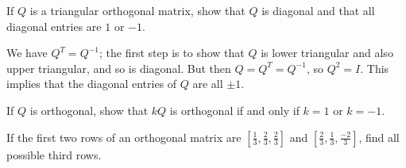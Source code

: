 \documentclass{ximera}
\begin{document}
\begin{problem}\label{prob:triag_orthogonal}
If $Q$ is a triangular orthogonal matrix, show that $Q$ is diagonal and that all diagonal entries are $1$ or $-1$.

\begin{hint}
We have $Q^{T} = Q^{-1}$; the first step is to show that $Q$ is lower triangular and also upper triangular, and so is diagonal. But then $Q = Q^{T} = Q^{-1}$, so $Q^{2} = I$. This implies that the diagonal entries of $Q$ are all $\pm 1$.
\end{hint}
\end{problem}

\begin{problem}\label{prob:scalar_othogonal}
If $Q$ is orthogonal, show that $kQ$ is orthogonal if and only if $k = 1$ or $k = -1$.
\end{problem}

\begin{problem}\label{prob:thirdrow}
If the first two rows of an orthogonal matrix are $[\frac{1}{3}, \frac{2}{3}, \frac{2}{3}]$ and $[\frac{2}{3}, \frac{1}{3}, \frac{-2}{3}]$, find all possible third rows.
\end{problem}
\end{document}
